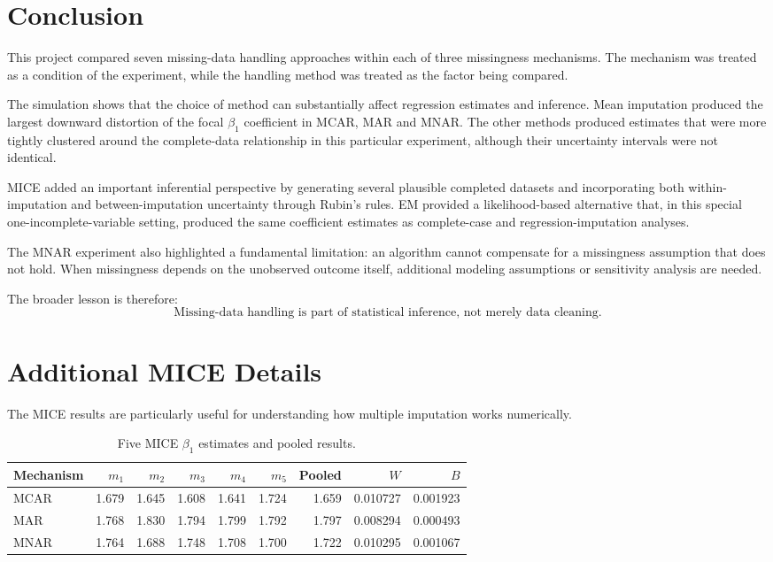 \documentclass[11pt,a4paper]{article}
\begin{document}
\section{Conclusion}
This project compared seven missing-data handling approaches within each of three missingness mechanisms. The mechanism was treated as a condition of the experiment, while the handling method was treated as the factor being compared.

The simulation shows that the choice of method can substantially affect regression estimates and inference. Mean imputation produced the largest downward distortion of the focal $\beta_1$ coefficient in MCAR, MAR and MNAR. The other methods produced estimates that were more tightly clustered around the complete-data relationship in this particular experiment, although their uncertainty intervals were not identical.

MICE added an important inferential perspective by generating several plausible completed datasets and incorporating both within-imputation and between-imputation uncertainty through Rubin's rules. EM provided a likelihood-based alternative that, in this special one-incomplete-variable setting, produced the same coefficient estimates as complete-case and regression-imputation analyses.

The MNAR experiment also highlighted a fundamental limitation: an algorithm cannot compensate for a missingness assumption that does not hold. When missingness depends on the unobserved outcome itself, additional modeling assumptions or sensitivity analysis are needed.

The broader lesson is therefore:
\[
\boxed{\text{Missing-data handling is part of statistical inference, not merely data cleaning.}}
\]

\newpage
\appendix
\section{Additional MICE Details}
The MICE results are particularly useful for understanding how multiple imputation works numerically.

\begin{table}[H]
\centering
\small
\caption{Five MICE $\beta_1$ estimates and pooled results.}
\begin{tabular}{lrrrrrrrr}
\toprule
Mechanism & $m_1$ & $m_2$ & $m_3$ & $m_4$ & $m_5$ & Pooled & $W$ & $B$\\
\midrule
MCAR & 1.679 & 1.645 & 1.608 & 1.641 & 1.724 & 1.659 & 0.010727 & 0.001923\\
MAR & 1.768 & 1.830 & 1.794 & 1.799 & 1.792 & 1.797 & 0.008294 & 0.000493\\
MNAR & 1.764 & 1.688 & 1.748 & 1.708 & 1.700 & 1.722 & 0.010295 & 0.001067\\
\bottomrule
\end{tabular}
\end{table}
\end{document}
